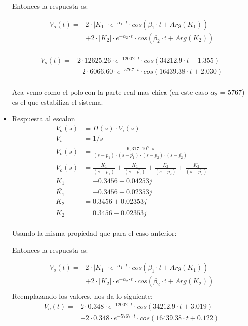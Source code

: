 \documentclass[11pt]{diazessay} %
\begin{document}
\begin{itemize}
Entonces la respuesta es:

\begin{align*}
V_{o}(t) = &2 \cdot |K_{1}| \cdot e^{- \alpha_{1} \cdot t} \cdot cos(\beta_{1} \cdot t + Arg(K_{1})) \\
&+  2 \cdot |K_{2}| \cdot e^{- \alpha_{2} \cdot t} \cdot cos(\beta_{2} \cdot t + Arg(K_{2}))\\[10pt]
\end{align*}

\begin{align*}
V_{o}(t) = &2 \cdot 12625.26 \cdot e^{-12002 \cdot t} \cdot cos(34212.9 \cdot t - 1.355) \\
&+  2 \cdot 6066.60 \cdot e^{-5767 \cdot t} \cdot cos(16439.38 \cdot t + 2.030)\\[10pt]
\end{align*}

Aca vemo como el polo con la parte real mas chica (en este caso $\alpha_{2}$ = 5767) es el que estabiliza el sistema.

\newpage
\item Respuesta al escalon
\begin{align*}
V_{o}(s) &= H(s) \cdot V_{i}(s)\\[10pt]
V_{i} &= 1/s \\[10pt]
V_{o}(s) &= \frac{6,317 \cdot 10^8 \cdot s}{(s - p_{1}) \cdot (s - \bar{p_{1}}) \cdot (s - p_{2}) \cdot (s - \bar{p_{2}})} \\[10pt]
V_{o}(s) &= \frac{K_{1}}{(s - p_{1})} + \frac{\bar{K_{1}}}{(s - \bar{p_{1}})} +  \frac{K_{2}}{(s - p_{2})} + \frac{\bar{K_{2}}}{(s - \bar{p_{2}})} \\[10pt]
K_{1} &= -0.3456 + 0.04253j \\[10pt]
\bar{K_{1}} &= -0.3456 - 0.02353j \\[10pt]
K_{2} &= 0.3456 + 0.02353j  \\[10pt]
\bar{K_{2}} &= 0.3456 - 0.02353j  \\[10pt]
\end{align*}

Usando la misma propiedad que para el caso anterior:

Entonces la respuesta es:

\begin{align*}
V_{o}(t) = &2 \cdot |K_{1}| \cdot e^{- \alpha_{1} \cdot t} \cdot cos(\beta_{1} \cdot t + Arg(K_{1})) \\
&+  2 \cdot |K_{2}| \cdot e^{- \alpha_{2} \cdot t} \cdot cos(\beta_{2} \cdot t + Arg(K_{2}))\\
\end{align*}
Reemplazando los valores, nos da lo siguiente:
\begin{align*}
V_{o}(t) = &2 \cdot 0.348 \cdot e^{-12002 \cdot t} \cdot cos(34212.9 \cdot t + 3.019) \\
&+  2 \cdot 0.348 \cdot e^{-5767 \cdot t} \cdot cos(16439.38 \cdot t + 0.122)\\[10pt]
\end{align*}


\end{itemize}
\end{document}
